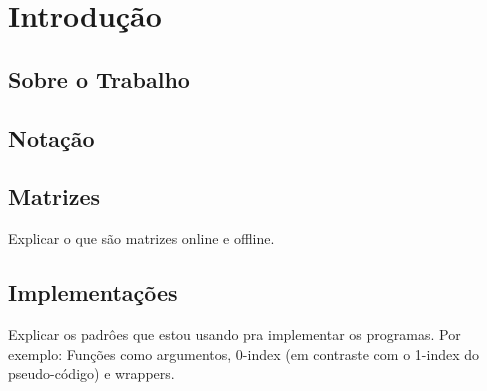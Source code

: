 \section{Introdução}
\label{Introducao}

\subsection{Sobre o Trabalho}

\subsection{Notação}

\subsection{Matrizes}
Explicar o que são matrizes online e offline.

\subsection{Implementações} \label{Introducao_Implementacao}
Explicar os padrôes que estou usando pra implementar os programas. Por exemplo: Funções como argumentos, 0-index (em contraste com o 1-index do pseudo-código) e wrappers.

